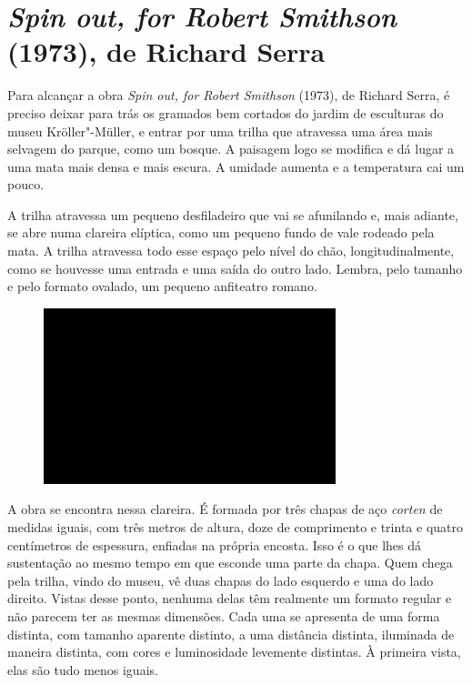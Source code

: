 \chapter{\emph{Spin out, for Robert Smithson} (1973), de Richard Serra}

Para alcançar a obra \emph{Spin out, for Robert Smithson} (1973), de
Richard Serra, é preciso deixar para trás os gramados bem cortados do
jardim de esculturas do museu Kröller"-Müller, e entrar por uma trilha
que atravessa uma área mais selvagem do parque, como um bosque. A
paisagem logo se modifica e dá lugar a uma mata mais densa e mais
escura. A umidade aumenta e a temperatura cai um pouco.

A trilha atravessa um pequeno desfiladeiro que vai se afunilando e, mais
adiante, se abre numa clareira elíptica, como um pequeno fundo de vale
rodeado pela mata. A trilha atravessa todo esse espaço pelo nível do
chão, longitudinalmente, como se houvesse uma entrada e uma saída do
outro lado. Lembra, pelo tamanho e pelo formato ovalado, um pequeno
anfiteatro romano.

\begin{figure}[!ht]

\centering
 \includegraphics[width=85mm]{./imgs/im1.jpg}
\caption{\tiny{}}

\end{figure}

A obra se encontra nessa clareira. É formada por três chapas de aço
\emph{corten} de medidas iguais, com três metros de altura, doze de
comprimento e trinta e quatro centímetros de espessura, enfiadas na
própria encosta. Isso é o que lhes dá sustentação ao mesmo tempo em que
esconde uma parte da chapa. Quem chega pela trilha, vindo do museu, vê
duas chapas do lado esquerdo e uma do lado direito. Vistas desse ponto,
nenhuma delas têm realmente um formato regular e não parecem ter as
mesmas dimensões. Cada uma se apresenta de uma forma distinta, com
tamanho aparente distinto, a uma distância distinta, iluminada de
maneira distinta, com cores e luminosidade levemente distintas. À
primeira vista, elas são tudo menos iguais.

